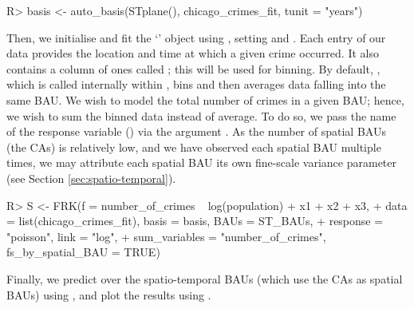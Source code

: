 \documentclass[nojss]{jss}
\newcommand{\class}[1]{`\code{#1}'}
\newcommand{\fct}[1]{\code{#1()}}
\begin{document}
\begin{Code}
R> basis <- auto_basis(STplane(), chicago_crimes_fit, tunit = "years")
\end{Code}
Then, we initialise and fit the \class{SRE} object using \fct{FRK}, setting  and . 
 Each entry of our data provides the location and time at which a given crime occurred. It also contains a column of ones called ; this will be used for binning. 
 By default, \fct{SRE}, which is called internally within \fct{FRK}, bins and then averages data falling into the same BAU. 
 We wish to model the total number of crimes in a given BAU; hence, we wish to sum the binned data instead of average. To do so, we pass the name of the response variable () via the argument .
As the number of spatial BAUs (the CAs) is relatively low, and we have observed each spatial BAU multiple times, we may attribute each spatial BAU its own fine-scale variance parameter (see Section \ref{sec:spatio-temporal}). %
\begin{Code}
R> S <- FRK(f = number_of_crimes ~ log(population) + x1 + x2 + x3,   
+    data = list(chicago_crimes_fit), basis = basis, BAUs = ST_BAUs,         
+    response = "poisson", link = "log", 
+    sum_variables = "number_of_crimes", fs_by_spatial_BAU = TRUE) 
\end{Code}
Finally, we predict over the spatio-temporal BAUs (which use the CAs as spatial BAUs) using \fct{predict}, and plot the results using \fct{plot}.
%
%
%                  
\end{document}
